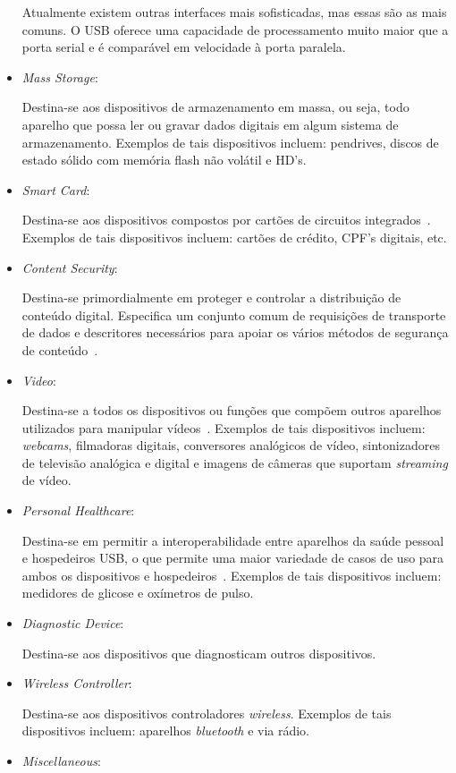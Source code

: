 \begin{itemize}
	Atualmente existem outras interfaces mais sofisticadas, mas essas são as mais comuns. O USB oferece uma capacidade de processamento muito maior que a porta serial e é comparável em velocidade à porta paralela.
	\item \emph{Mass Storage}: 

	Destina-se aos dispositivos de armazenamento em massa, ou seja, todo aparelho que possa ler ou gravar dados digitais em algum sistema de armazenamento.	Exemplos de tais dispositivos incluem: pendrives, discos de estado sólido com memória flash não volátil e HD's.
	\begin{comment}\item \emph{Hub}: \end{comment}
	\item \emph{Smart Card}: 

	Destina-se aos dispositivos compostos por cartões de circuitos integrados~\cite{usbsmartcard}. Exemplos de tais dispositivos incluem: cartões de crédito, CPF's digitais, etc.
	\item \emph{Content Security}: 

	Destina-se primordialmente em proteger e controlar a distribuição de conteúdo digital. Especifica um conjunto comum de requisições de transporte de dados e descritores necessários para apoiar os vários métodos de segurança de conteúdo~\cite{usbcontentsecurityclass}.
	\item \emph{Video}: 

	Destina-se a todos os dispositivos ou funções que compõem outros aparelhos utilizados para manipular vídeos~\cite{usbvideoclass}. Exemplos de tais dispositivos incluem: \emph{webcams}, filmadoras digitais, conversores analógicos de vídeo, sintonizadores de televisão analógica e digital e imagens de câmeras que suportam \emph{streaming} de vídeo.
	\item \emph{Personal Healthcare}: 

	Destina-se em permitir a interoperabilidade entre aparelhos da saúde pessoal e hospedeiros USB, o que permite uma maior variedade de casos de uso para ambos os dispositivos e hospedeiros~\cite{usbhealthcareclass}. Exemplos de tais dispositivos incluem: medidores de glicose e oxímetros de pulso.
	\item \emph{Diagnostic Device}:

	Destina-se aos dispositivos que diagnosticam outros dispositivos.
	\item \emph{Wireless Controller}: 

	Destina-se aos dispositivos controladores \emph{wireless}. Exemplos de tais dispositivos incluem: aparelhos \emph{bluetooth} e via rádio.
	\item \emph{Miscellaneous}:


\end{itemize}
